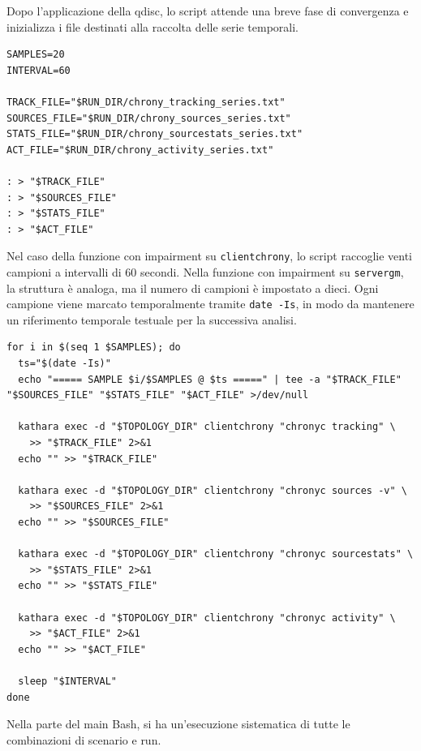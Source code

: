 Dopo l'applicazione della qdisc, lo script attende una breve fase di convergenza
e inizializza i file destinati alla raccolta delle serie temporali.

\begin{listing}[H]
\begin{verbatim}
SAMPLES=20
INTERVAL=60

TRACK_FILE="$RUN_DIR/chrony_tracking_series.txt"
SOURCES_FILE="$RUN_DIR/chrony_sources_series.txt"
STATS_FILE="$RUN_DIR/chrony_sourcestats_series.txt"
ACT_FILE="$RUN_DIR/chrony_activity_series.txt"

: > "$TRACK_FILE"
: > "$SOURCES_FILE"
: > "$STATS_FILE"
: > "$ACT_FILE"
\end{verbatim}
\caption{Inizializzazione dei file di output Chrony.}
\label{lst:auto-chrony-files}
\end{listing}

Nel caso della funzione con impairment su \texttt{clientchrony}, lo script raccoglie
venti campioni a intervalli di 60 secondi. Nella funzione con impairment su
\texttt{servergm}, la struttura è analoga, ma il numero di campioni è impostato a
dieci. Ogni campione viene marcato temporalmente tramite \texttt{date -Is}, in
modo da mantenere un riferimento temporale testuale per la successiva analisi.

\begin{listing}[H]
\begin{verbatim}
for i in $(seq 1 $SAMPLES); do
  ts="$(date -Is)"
  echo "===== SAMPLE $i/$SAMPLES @ $ts =====" | tee -a "$TRACK_FILE" "$SOURCES_FILE" "$STATS_FILE" "$ACT_FILE" >/dev/null

  kathara exec -d "$TOPOLOGY_DIR" clientchrony "chronyc tracking" \
    >> "$TRACK_FILE" 2>&1
  echo "" >> "$TRACK_FILE"

  kathara exec -d "$TOPOLOGY_DIR" clientchrony "chronyc sources -v" \
    >> "$SOURCES_FILE" 2>&1
  echo "" >> "$SOURCES_FILE"

  kathara exec -d "$TOPOLOGY_DIR" clientchrony "chronyc sourcestats" \
    >> "$STATS_FILE" 2>&1
  echo "" >> "$STATS_FILE"

  kathara exec -d "$TOPOLOGY_DIR" clientchrony "chronyc activity" \
    >> "$ACT_FILE" 2>&1
  echo "" >> "$ACT_FILE"

  sleep "$INTERVAL"
done
\end{verbatim}
\caption{Raccolta periodica delle metriche Chrony.}
\label{lst:auto-chrony-loop}
\end{listing}
Nella parte del main Bash, si ha un'esecuzione sistematica di tutte le
combinazioni di scenario e run.

